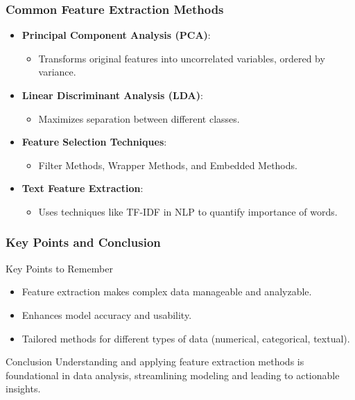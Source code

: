 \documentclass[aspectratio=169]{beamer}
\begin{document}
\begin{frame}[fragile]
    \frametitle{Common Feature Extraction Methods}
    \begin{itemize}
        \item \textbf{Principal Component Analysis (PCA)}:
        \begin{itemize}
            \item Transforms original features into uncorrelated variables, ordered by variance.
        \end{itemize}
        \item \textbf{Linear Discriminant Analysis (LDA)}:
        \begin{itemize}
            \item Maximizes separation between different classes.
        \end{itemize}
        \item \textbf{Feature Selection Techniques}:
        \begin{itemize}
            \item Filter Methods, Wrapper Methods, and Embedded Methods.
        \end{itemize}
        \item \textbf{Text Feature Extraction}:
        \begin{itemize}
            \item Uses techniques like TF-IDF in NLP to quantify importance of words.
        \end{itemize}
    \end{itemize}
\end{frame}

\begin{frame}[fragile]
    \frametitle{Key Points and Conclusion}
    \begin{block}{Key Points to Remember}
        \begin{itemize}
            \item Feature extraction makes complex data manageable and analyzable.
            \item Enhances model accuracy and usability.
            \item Tailored methods for different types of data (numerical, categorical, textual).
        \end{itemize}
    \end{block}
    \begin{block}{Conclusion}
        Understanding and applying feature extraction methods is foundational in data analysis, streamlining modeling and leading to actionable insights.
    \end{block}
\end{frame}
\end{document}
